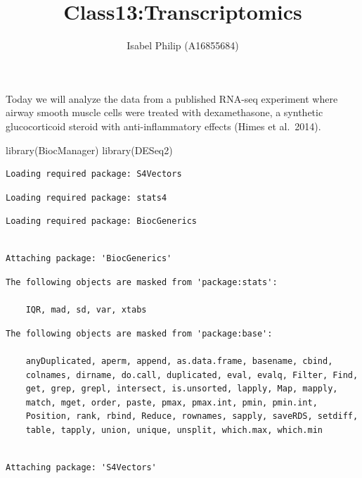 \documentclass[
  letterpaper,
  DIV=11,
  numbers=noendperiod]{scrartcl}
\title{Class13:Transcriptomics}
\author{Isabel Philip (A16855684)}
\date{}
\newenvironment{Shaded}{\begin{snugshade}}{\end{snugshade}}
\newcommand{\FunctionTok}[1]{\textcolor[rgb]{0.28,0.35,0.67}{#1}}
\newcommand{\NormalTok}[1]{\textcolor[rgb]{0.00,0.23,0.31}{#1}}
\begin{document}
\maketitle


Today we will analyze the data from a published RNA-seq experiment where
airway smooth muscle cells were treated with dexamethasone, a synthetic
glucocorticoid steroid with anti-inflammatory effects (Himes et
al.~2014).

\begin{Shaded}
\begin{Highlighting}[]
\FunctionTok{library}\NormalTok{(BiocManager)}
\FunctionTok{library}\NormalTok{(DESeq2)}
\end{Highlighting}
\end{Shaded}

\begin{verbatim}
Loading required package: S4Vectors
\end{verbatim}

\begin{verbatim}
Loading required package: stats4
\end{verbatim}

\begin{verbatim}
Loading required package: BiocGenerics
\end{verbatim}

\begin{verbatim}

Attaching package: 'BiocGenerics'
\end{verbatim}

\begin{verbatim}
The following objects are masked from 'package:stats':

    IQR, mad, sd, var, xtabs
\end{verbatim}

\begin{verbatim}
The following objects are masked from 'package:base':

    anyDuplicated, aperm, append, as.data.frame, basename, cbind,
    colnames, dirname, do.call, duplicated, eval, evalq, Filter, Find,
    get, grep, grepl, intersect, is.unsorted, lapply, Map, mapply,
    match, mget, order, paste, pmax, pmax.int, pmin, pmin.int,
    Position, rank, rbind, Reduce, rownames, sapply, saveRDS, setdiff,
    table, tapply, union, unique, unsplit, which.max, which.min
\end{verbatim}

\begin{verbatim}

Attaching package: 'S4Vectors'
\end{verbatim}
\end{document}
